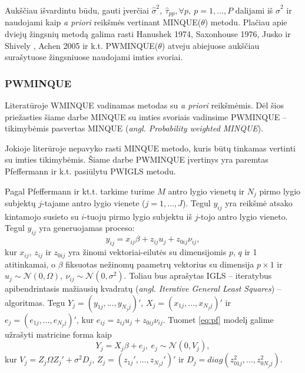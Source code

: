 \documentclass[12pt,a4paper]{article}
\begin{document}
\indent Aukščiau išvardintu būdu, gauti įverčiai $\hat{\sigma}^2,\ \hat{\tau}_{pp}, \forall p,\ p=1,\dots,P$ dalijami iš $\hat{\sigma}^2$ ir naudojami kaip \textit{a priori} reikšmės vertinant MINQUE($\theta$) metodu. Plačiau apie dviejų žingsnių metodą galima rasti Hanushek 1974\cite{hanushek}, Saxonhouse 1976\cite{saxonhouse}, Jusko ir Shively \cite{jusko},  Achen 2005\cite{achen} ir k.t. PWMINQUE($\theta$) atveju abiejuose aukščiau surašytuose žingsniuose naudojami imties svoriai.


\subsubsection{PWMINQUE}
\indent Literatūroje WMINQUE vadinamas metodas su \textit{a priori} reikšmėmis. Dėl šios priežasties šiame darbe MINQUE su imties svoriais vadinsime PWMINQUE -- tikimybėmis pasvertas MINQUE (\textit{angl. Probability weighted MINQUE}).

\indent Jokioje literūroje nepavyko rasti MINQUE metodo, kuris būtų tinkamas vertinti su imties tikimybėmis. Šiame darbe PWMINQUE įvertinys yra paremtas Pfeffermann ir k.t.\cite{pfeff} pasiūlytu PWIGLS metodu.

\indent Pagal Pfeffermann ir kt.t. tarkime turime $M$ antro lygio vienetų ir $N_j$ pirmo lygio subjektų $j$-tajame antro lygio vienete ($j=1,\dots,J$). Tegul $y_{ij}$ yra reikšmė atsako kintamojo susieto su $i$-tuoju pirmo lygio subjektu iš $j$-tojo antro lygio vieneto. Tegul $y_{ij}$ yra generuojamas proceso:
\begin{equation}\label{eq:pf}
y_{ij}=x_{ij}\beta+z_{ij}u_j+z_{0ij}\nu_{ij},
\end{equation} 
kur $x_{ij}$, $z_{ij}$ ir $z_{0ij}$ yra žinomi vektoriai-eilutės su dimensijomis $p$, $q$ ir 1 atitinkamai, o $\beta$ fiksuotas nežinomų paametrų vektorius su dimensija $p\times1$ ir $u_j\sim \mathcal{N}(0, \Omega),\ \nu_{ij}\sim \mathcal{N}(0, \sigma^2)$. Toliau bus aprašytas IGLS -- iteratybus apibendrintasis mažiausių kvadratų (\textit{angl. Iterative General Least Squares}) -- algoritmas. Tegu $Y_j = (y_{1j},\dots,y_{N_jj})'$, $X_j=(x_{1j},\dots,x_{N_jj})'$ ir $e_j=(e_{1j},\dots,e_{N_jj})'$, kur $e_{ij}=z_{ij}u_j+z_{0ij}\nu_{ij}$. Tuomet \ref{eq:pf} modelį galime užrašyti matricine forma kaip
\begin{equation}
Y_j=X_j\beta+e_j, \ e_j\sim \mathcal{N}(0, V_j),
\end{equation}
kur $V_j=Z_j\Omega Z_j'+\sigma^2D_j$, $Z_j=(z_{1j}',\dots,z_{N_jj}')'$ ir $D_j=diag(z_{01j}^2,\dots,z_{0N_jj}^2)$.
\end{document}

